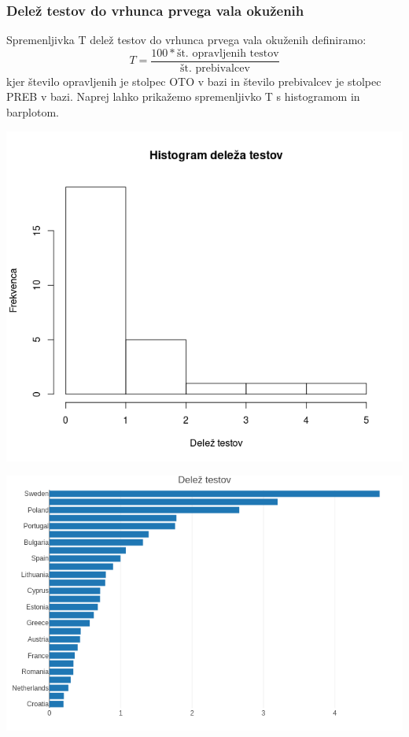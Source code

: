 \documentclass[a4paper,11pt]{article}
\begin{document}
\subsubsection{Delež testov do vrhunca prvega vala okuženih}
Spremenljivka T delež testov do vrhunca prvega vala okuženih definiramo:
\[T = \frac{100 * \text{št. opravljenih testov}}{\text{št. prebivalcev}}\]
kjer število opravljenih je stolpec OTO v bazi in število prebivalcev je stolpec PREB v bazi. Naprej lahko prikažemo spremenljivko T s histogramom in barplotom.\\
\begin{center}
\includegraphics[scale=0.6]{histogram_delez_testov}\\
\end{center}
\begin{center}
\includegraphics[scale=0.6]{barplot_delez_testov}\\
\end{center}
\end{document}
